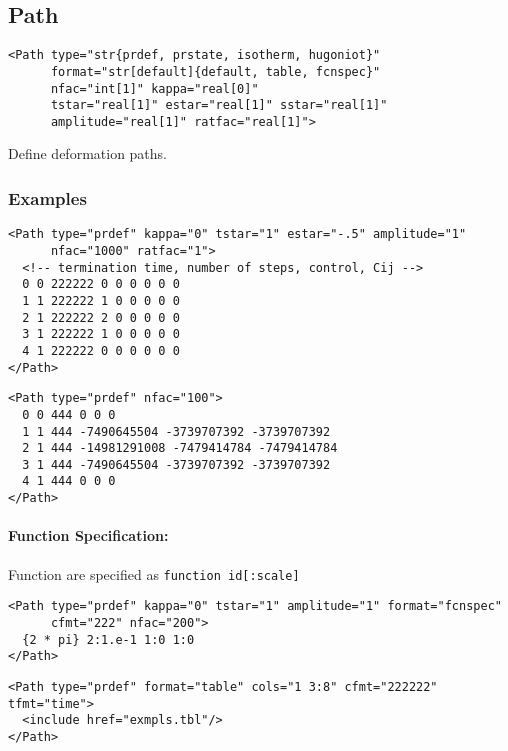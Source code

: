 \documentclass[11pt]{report}
\begin{document}
\subsection{Path}
\begin{verbatim}
<Path type="str{prdef, prstate, isotherm, hugoniot}"
      format="str[default]{default, table, fcnspec}"
      nfac="int[1]" kappa="real[0]"
      tstar="real[1]" estar="real[1]" sstar="real[1]"
      amplitude="real[1]" ratfac="real[1]">
\end{verbatim}
%
Define deformation paths.

\subsubsection{Examples}
\begin{verbatim}
<Path type="prdef" kappa="0" tstar="1" estar="-.5" amplitude="1"
      nfac="1000" ratfac="1">
  <!-- termination time, number of steps, control, Cij -->
  0 0 222222 0 0 0 0 0 0
  1 1 222222 1 0 0 0 0 0
  2 1 222222 2 0 0 0 0 0
  3 1 222222 1 0 0 0 0 0
  4 1 222222 0 0 0 0 0 0
</Path>
\end{verbatim}

\begin{verbatim}
<Path type="prdef" nfac="100">
  0 0 444 0 0 0
  1 1 444 -7490645504 -3739707392 -3739707392
  2 1 444 -14981291008 -7479414784 -7479414784
  3 1 444 -7490645504 -3739707392 -3739707392
  4 1 444 0 0 0
</Path>
\end{verbatim}

\paragraph{Function Specification:}
Function are specified as \texttt{function id[:scale]}
\begin{verbatim}
<Path type="prdef" kappa="0" tstar="1" amplitude="1" format="fcnspec"
      cfmt="222" nfac="200">
  {2 * pi} 2:1.e-1 1:0 1:0
</Path>
\end{verbatim}

\begin{verbatim}
<Path type="prdef" format="table" cols="1 3:8" cfmt="222222" tfmt="time">
  <include href="exmpls.tbl"/>
</Path>
\end{verbatim}

\end{document}
